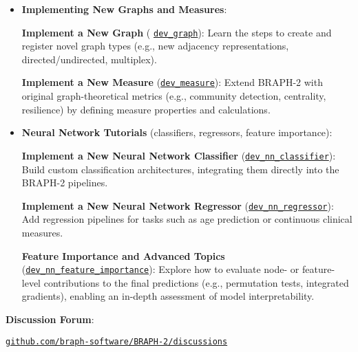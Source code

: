 \documentclass[justified]{tufte-handout}
\begin{document}
\begin{itemize}
\item \textbf{Implementing New Graphs and Measures}: 

\textbf{Implement a New Graph} ( \href{https://github.com/braph-software/BRAPH-2/tree/develop/tutorials/developers/dev_graph}{\texttt{dev\_graph}}):  
Learn the steps to create and register novel graph types (e.g., new adjacency representations, directed/undirected, multiplex).

\textbf{Implement a New Measure} (\href{https://github.com/braph-software/BRAPH-2/tree/develop/tutorials/developers/dev_measure}{\texttt{dev\_measure}}):
Extend BRAPH-2 with original graph-theoretical metrics (e.g., community detection, centrality, resilience) by defining measure properties and calculations.

\item \textbf{Neural Network Tutorials} (classifiers, regressors, feature importance):

\textbf{Implement a New Neural Network Classifier} (\href{https://github.com/braph-software/BRAPH-2/tree/develop/tutorials/developers/dev_neural_networks/dev_nn_classifier}{\texttt{dev\_nn\_classifier}}):
Build custom classification architectures, integrating them directly into the BRAPH-2 pipelines.

\textbf{Implement a New Neural Network Regressor} (\href{https://github.com/braph-software/BRAPH-2/tree/develop/tutorials/developers/dev_neural_networks/dev_nn_regressor}{\texttt{dev\_nn\_regressor}}):  
Add regression pipelines for tasks such as age prediction or continuous clinical measures.

\textbf{Feature Importance and Advanced Topics} (\href{https://github.com/braph-software/BRAPH-2/tree/develop/tutorials/developers/dev_neural_networks/dev_nn_feature_importance}{\texttt{dev\_nn\_feature\_importance}}):  
Explore how to evaluate node- or feature-level contributions to the final predictions (e.g., permutation tests, integrated gradients), enabling an in-depth assessment of model interpretability.

\end{itemize}

\textbf{Discussion Forum}: 

\href{https://github.com/braph-software/BRAPH-2/discussions}{\texttt{github.com/braph-software/BRAPH-2/discussions}}
\end{document}

